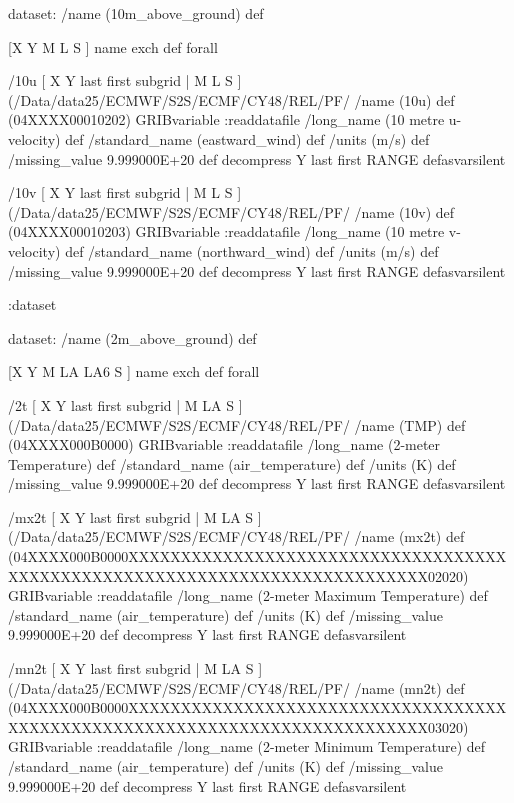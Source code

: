 \begin{ingrid}

dataset:
/name (10m_above_ground) def

[X Y M L S ] {name exch def } forall

/10u { [ X Y last first subgrid | M L S ] (/Data/data25/ECMWF/S2S/ECMF/CY48/REL/PF/%
/name (10u) def
(04XXXX00010202) GRIBvariable
:readdatafile
/long_name (10 metre u-velocity) def
/standard_name (eastward_wind) def
/units (m/s) def
/missing_value 9.999000E+20 def
decompress
Y last first RANGE
} defasvarsilent

/10v { [ X Y last first subgrid | M L S ] (/Data/data25/ECMWF/S2S/ECMF/CY48/REL/PF/%
/name (10v) def
(04XXXX00010203) GRIBvariable
:readdatafile
/long_name (10 metre v-velocity) def
/standard_name (northward_wind) def
/units (m/s) def
/missing_value 9.999000E+20 def
decompress
Y last first RANGE
} defasvarsilent

:dataset

dataset:
/name (2m_above_ground) def

[X Y M LA LA6 S ] {name exch def } forall


/2t { [ X Y last first subgrid | M LA S ] (/Data/data25/ECMWF/S2S/ECMF/CY48/REL/PF/%
/name (TMP) def
(04XXXX000B0000) GRIBvariable
:readdatafile
/long_name (2-meter Temperature) def
/standard_name (air_temperature) def
/units (K) def
/missing_value 9.999000E+20 def
decompress
Y last first RANGE
} defasvarsilent


/mx2t { [ X Y last first subgrid | M LA S ] (/Data/data25/ECMWF/S2S/ECMF/CY48/REL/PF/%
/name (mx2t) def
(04XXXX000B0000XXXXXXXXXXXXXXXXXXXXXXXXXXXXXXXXXXXXXXXXXXXXXXXXXXXXXXXXXXXXXXXXXXXXXXXXXXXX02020) GRIBvariable
:readdatafile
/long_name (2-meter Maximum Temperature) def
/standard_name (air_temperature) def
/units (K) def
/missing_value 9.999000E+20 def
decompress
Y last first RANGE
} defasvarsilent

/mn2t { [ X Y last first subgrid | M LA S ] (/Data/data25/ECMWF/S2S/ECMF/CY48/REL/PF/%
/name (mn2t) def
(04XXXX000B0000XXXXXXXXXXXXXXXXXXXXXXXXXXXXXXXXXXXXXXXXXXXXXXXXXXXXXXXXXXXXXXXXXXXXXXXXXXXX03020) GRIBvariable
:readdatafile
/long_name (2-meter Minimum Temperature) def
/standard_name (air_temperature) def
/units (K) def
/missing_value 9.999000E+20 def
decompress
Y last first RANGE
} defasvarsilent



\end{ingrid}
